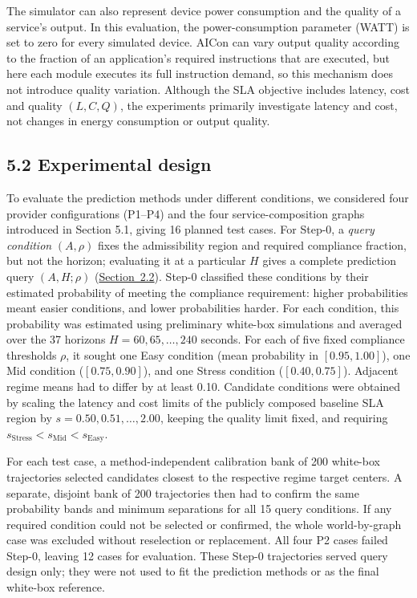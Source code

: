 \documentclass[10pt,a4paper]{article}
\begin{document}
The simulator can also represent device power consumption and the quality of a service's output. In this evaluation, the power-consumption parameter (WATT) is set to zero for every simulated device. AICon can vary output quality according to the fraction of an application's required instructions that are executed, but here each module executes its full instruction demand, so this mechanism does not introduce quality variation. Although the SLA objective includes latency, cost and quality $(L,C,Q)$, the experiments primarily investigate latency and cost, not changes in energy consumption or output quality.

\subsection*{5.2 Experimental design}
\label{sec:experimental-design}

To evaluate the prediction methods under different conditions, we considered four provider configurations (P1--P4) and the four service-composition graphs introduced in Section 5.1, giving 16 planned test cases. For Step-0, a \emph{query condition} $(A,\rho)$ fixes the admissibility region and required compliance fraction, but not the horizon; evaluating it at a particular $H$ gives a complete prediction query $(A,H;\rho)$ (\hyperref[sec:prediction-target]{Section~2.2}). Step-0 classified these conditions by their estimated probability of meeting the compliance requirement: higher probabilities meant easier conditions, and lower probabilities harder. For each condition, this probability was estimated using preliminary white-box simulations and averaged over the 37 horizons $H=60,65,\ldots,240$ seconds. For each of five fixed compliance thresholds $\rho$, it sought one Easy condition (mean probability in $[0.95,1.00]$), one Mid condition ($[0.75,0.90]$), and one Stress condition ($[0.40,0.75]$). Adjacent regime means had to differ by at least 0.10. Candidate conditions were obtained by scaling the latency and cost limits of the publicly composed baseline SLA region by $s=0.50,0.51,\ldots,2.00$, keeping the quality limit fixed, and requiring $s_{\mathrm{Stress}}<s_{\mathrm{Mid}}<s_{\mathrm{Easy}}$.

For each test case, a method-independent calibration bank of 200 white-box trajectories selected candidates closest to the respective regime target centers. A separate, disjoint bank of 200 trajectories then had to confirm the same probability bands and minimum separations for all 15 query conditions. If any required condition could not be selected or confirmed, the whole world-by-graph case was excluded without reselection or replacement. All four P2 cases failed Step-0, leaving 12 cases for evaluation. These Step-0 trajectories served query design only; they were not used to fit the prediction methods or as the final white-box reference.
\end{document}
